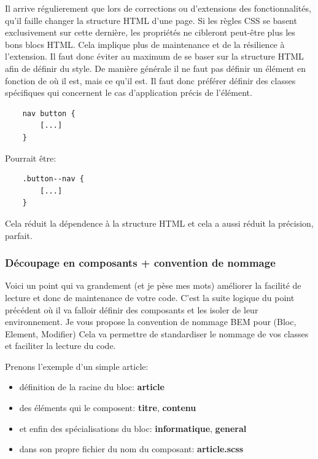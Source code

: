 \documentclass[12pt, a4paper]{report}
\begin{document}
\begin{appendix}
Il arrive régulierement que lors de corrections ou d'extensions des fonctionnalités, qu'il faille changer la structure HTML d'une page.
Si les règles CSS se basent exclusivement sur cette dernière, les propriétés ne cibleront peut-être plus les bons blocs HTML.
Cela implique plus de maintenance et de la résilience à l'extension.
Il faut donc éviter au maximum de se baser sur la structure HTML afin de définir du style.
De manière générale il ne faut pas définir un élément en fonction de où il est, mais ce qu'il est.
Il faut donc préférer définir des classes spécifiques qui concernent le cas d'application précis de l'élément.

\begin{lstlisting}
    nav button {
        [...]
    }
\end{lstlisting}

Pourrait être:

\begin{lstlisting}
    .button--nav {
        [...]
    }
\end{lstlisting}

Cela réduit la dépendence à la structure HTML et cela a aussi réduit la précision, parfait.

\subsubsection{Découpage en composants + convention de nommage}

Voici un point qui va grandement (et je pèse mes mots) améliorer la facilité de lecture et donc de maintenance de votre code.
C'est la suite logique du point précédent où il va falloir définir des composants et les isoler de leur environnement.
Je vous propose la convention de nommage BEM pour (Bloc, Element, Modifier)
Cela va permettre de standardiser le nommage de vos classes et faciliter la lecture du code.

Prenons l'exemple d'un simple article:
\begin{itemize}
    \item définition de la racine du bloc: \textbf{article}
    \item des éléments qui le composent: \textbf{titre}, \textbf{contenu}
    \item et enfin des spécialisations du bloc: \textbf{informatique}, \textbf{general}
    \item dans son propre fichier du nom du composant: \textbf{\textunderscore article.scss}
\end{itemize}


\end{appendix}
\end{document}
